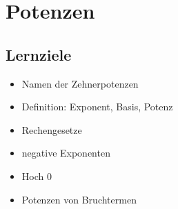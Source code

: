 
\section{Potenzen}


\subsection*{Lernziele}

\begin{itemize}
\item Namen der Zehnerpotenzen
\item Definition: Exponent, Basis, Potenz
\item Rechengesetze
\item negative Exponenten
\item Hoch 0
\item Potenzen von Bruchtermen
\end{itemize}
\newpage








